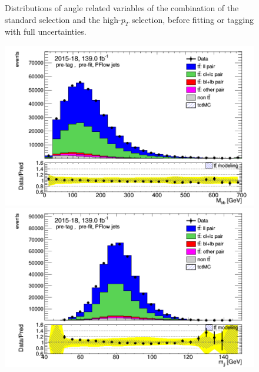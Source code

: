 \documentclass[letterpaper,12pt]{article}
\begin{document}
\begin{figure}
\begin{minipage}[b]{.45\textwidth}
	\end{minipage}
	\caption{Distributions of angle related variables of the combination of the standard 
	selection and the high-$p_T$ selection, before fitting or 
	tagging with full uncertainties.} \label{fig:angles_PFlow}
	\end{figure}
	
	
	\begin{figure}
	\begin{minipage}[b]{.45\textwidth}
	\centering
	\includegraphics[width=1\textwidth]{Oct_distributions/pretagNoRwDL1rwithhighpTPFlow_scaledall/DataMC_Mbb.png}
	\end{minipage}\hfill
	\begin{minipage}[b]{.45\textwidth}
	\centering
	\includegraphics[width=1\textwidth]{Oct_distributions/pretagNoRwDL1rwithhighpTPFlow_scaledall/DataMC_mjj.png}
	\end{minipage}
	\begin{minipage}[b]{.45\textwidth}

\end{minipage}
\end{figure}
\end{document}
